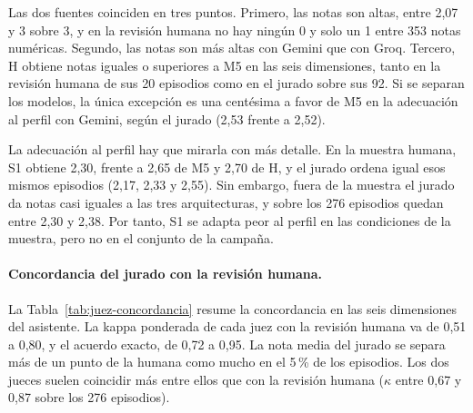 \begin{table}[!htbp]
\centering
\small
\caption[Notas medias de la revisión humana y del jurado.]{Notas medias por
configuración (escala 0--3) de la revisión humana (diez episodios de la
muestra) y del jurado (46 episodios). Continuidad excluye los episodios con
\texttt{NA}.}
\label{tab:calidad}

\end{table}

Las dos fuentes coinciden en tres puntos. Primero, las notas son altas, entre
2,07 y 3 sobre 3, y en la revisión humana no hay ningún 0 y solo un 1 entre 353
notas numéricas. Segundo, las notas son más altas con Gemini que con Groq.
Tercero, H obtiene notas iguales o superiores a M5 en las seis dimensiones,
tanto en la revisión humana de sus 20 episodios como en el jurado sobre sus 92.
Si se separan los modelos, la única excepción es una centésima a favor de M5 en
la adecuación al perfil con Gemini, según el jurado (2,53 frente a 2,52).

La adecuación al perfil hay que mirarla con más detalle. En la muestra humana,
S1 obtiene 2,30, frente a 2,65 de M5 y 2,70 de H, y el jurado ordena igual esos
mismos episodios (2,17, 2,33 y 2,55). Sin embargo, fuera de la muestra el
jurado da notas casi iguales a las tres arquitecturas, y sobre los 276
episodios quedan entre 2,30 y 2,38. Por tanto, S1 se adapta peor al perfil en
las condiciones de la muestra, pero no en el conjunto de la campaña.

\paragraph{Concordancia del jurado con la revisión humana.}
La Tabla~\ref{tab:juez-concordancia} resume la concordancia en las seis
dimensiones del asistente. La kappa ponderada de cada juez con la revisión
humana va de 0,51 a 0,80, y el acuerdo exacto, de 0,72 a 0,95. La nota media
del jurado se separa más de un punto de la humana como mucho en el 5\,\% de los
episodios. Los dos jueces suelen coincidir más entre ellos que con la revisión
humana ($\kappa$ entre 0,67 y 0,87 sobre los 276 episodios).

